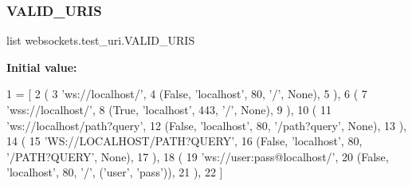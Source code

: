 \subsubsection{\texorpdfstring{V\+A\+L\+I\+D\+\_\+\+U\+R\+IS}{VALID\_URIS}}
{\footnotesize\ttfamily list websockets.\+test\+\_\+uri.\+V\+A\+L\+I\+D\+\_\+\+U\+R\+IS}

{\bfseries Initial value\+:}
\begin{DoxyCode}
1 =  [
2     (
3         \textcolor{stringliteral}{'ws://localhost/'},
4         (\textcolor{keyword}{False}, \textcolor{stringliteral}{'localhost'}, 80, \textcolor{stringliteral}{'/'}, \textcolor{keywordtype}{None}),
5     ),
6     (
7         \textcolor{stringliteral}{'wss://localhost/'},
8         (\textcolor{keyword}{True}, \textcolor{stringliteral}{'localhost'}, 443, \textcolor{stringliteral}{'/'}, \textcolor{keywordtype}{None}),
9     ),
10     (
11         \textcolor{stringliteral}{'ws://localhost/path?query'},
12         (\textcolor{keyword}{False}, \textcolor{stringliteral}{'localhost'}, 80, \textcolor{stringliteral}{'/path?query'}, \textcolor{keywordtype}{None}),
13     ),
14     (
15         \textcolor{stringliteral}{'WS://LOCALHOST/PATH?QUERY'},
16         (\textcolor{keyword}{False}, \textcolor{stringliteral}{'localhost'}, 80, \textcolor{stringliteral}{'/PATH?QUERY'}, \textcolor{keywordtype}{None}),
17     ),
18     (
19         \textcolor{stringliteral}{'ws://user:pass@localhost/'},
20         (\textcolor{keyword}{False}, \textcolor{stringliteral}{'localhost'}, 80, \textcolor{stringliteral}{'/'}, (\textcolor{stringliteral}{'user'}, \textcolor{stringliteral}{'pass'})),
21     ),
22 ]
\end{DoxyCode}
